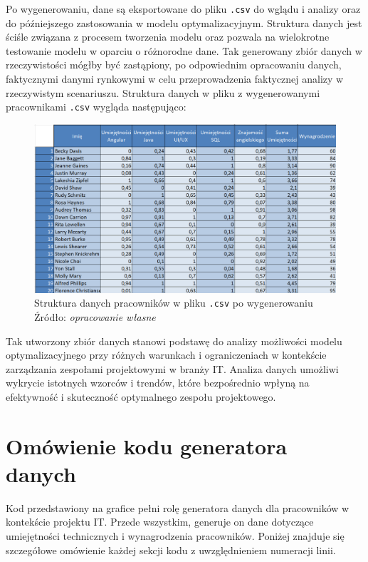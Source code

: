 \par Po wygenerowaniu, dane są eksportowane do pliku \verb|.csv| do wglądu i analizy oraz do późniejszego zastosowania w modelu optymalizacyjnym. Struktura danych jest ściśle związana z procesem tworzenia modelu oraz pozwala na wielokrotne testowanie modelu w oparciu o różnorodne dane. Tak generowany zbiór danych w rzeczywistości mógłby być zastąpiony, po odpowiednim opracowaniu danych, faktycznymi danymi rynkowymi w celu przeprowadzenia faktycznej analizy w rzeczywistym scenariuszu. Struktura danych w pliku z wygenerowanymi pracownikami \verb|.csv| wygląda następująco:
\begin{figure}[H]
    \includegraphics[width=\linewidth]{chapters/Images/pracownicy_csv.png}
    \cprotect\caption{Struktura danych pracowników w pliku \verb|.csv| po wygenerowaniu\\ Źródło:\textit{ opracowanie własne}}
\end{figure}

\par Tak utworzony zbiór danych stanowi podstawę do analizy możliwości modelu optymalizacyjnego przy różnych warunkach i ograniczeniach w kontekście zarządzania zespołami projektowymi w branży IT. Analiza danych umożliwi wykrycie istotnych wzorców i trendów, które bezpośrednio wpłyną na efektywność i skuteczność optymalnego zespołu projektowego.



\section{Omówienie kodu generatora danych}\label{sec:kod_generator}
\par Kod przedstawiony na grafice pełni rolę generatora danych dla pracowników w kontekście projektu IT. Przede wszystkim, generuje on dane dotyczące umiejętności technicznych i wynagrodzenia pracowników. Poniżej znajduje się szczegółowe omówienie każdej sekcji kodu z uwzględnieniem numeracji linii.

